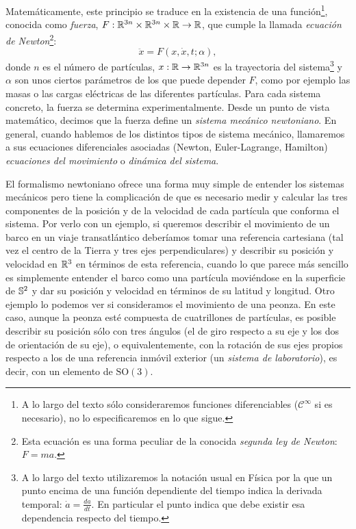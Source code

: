 Matemáticamente, este principio se traduce en la existencia de una función\footnote{A lo largo del texto sólo consideraremos funciones diferenciables ($\mathcal{C}^{\infty}$ si es necesario), no lo especificaremos en lo que sigue.}, conocida como \emph{fuerza}, $F: \mathbb{R}^{3n} \times \mathbb{R}^{3n} \times \mathbb{R} \rightarrow \mathbb{R}$, que cumple la llamada \emph{ecuación de Newton}\footnote{Esta ecuación es una forma peculiar de la conocida \emph{segunda ley de Newton}: $F=ma$.}:
\begin{equation*}
  \ddot{x} = F(x,\dot{x},t;\alpha),
\end{equation*}
donde $n$ es el número de partículas, $x:\mathbb{R} \rightarrow \mathbb{R}^{3n}$ es la trayectoria del sistema\footnote{A lo largo del texto utilizaremos la notación usual en Física por la que un punto encima de una función dependiente del tiempo indica la derivada temporal: $\dot{a}=\frac{da}{dt}$. En particular el punto indica que debe existir esa dependencia respecto del tiempo.} y $\alpha$ son unos ciertos parámetros de los que puede depender $F$, como por ejemplo las masas o las cargas eléctricas de las diferentes partículas. Para cada sistema concreto, la fuerza se determina experimentalmente. Desde un punto de vista matemático, decimos que la fuerza define un \emph{sistema mecánico newtoniano}. En general, cuando hablemos de los distintos tipos de sistema mecánico, llamaremos a sus ecuaciones diferenciales asociadas (Newton, Euler-Lagrange, Hamilton) \emph{ecuaciones del movimiento} o \emph{dinámica del sistema}.

El formalismo newtoniano ofrece una forma muy simple de entender los sistemas mecánicos pero tiene la complicación de que es necesario medir y calcular las tres componentes de la posición y de la velocidad de cada partícula que conforma el sistema. Por verlo con un ejemplo, si queremos describir el movimiento de un barco en un viaje transatlántico deberíamos tomar una referencia cartesiana (tal vez el centro de la Tierra y tres ejes perpendiculares) y describir su posición y velocidad en $\mathbb{R}^3$ en términos de esta referencia, cuando lo que parece más sencillo es simplemente entender el barco como una partícula moviéndose en la superficie de $\mathbb{S}^2$ y dar su posición y velocidad en términos de su latitud y longitud.
Otro ejemplo lo podemos ver si consideramos el movimiento de una peonza. En este caso, aunque la peonza esté compuesta de cuatrillones de partículas, es posible describir su posición sólo con tres ángulos (el de giro respecto a su eje y los dos de orientación de su eje), o equivalentemente, con la rotación de sus ejes propios respecto a los de una referencia inmóvil exterior (un \emph{sistema de laboratorio}), es decir, con un elemento de $\mathrm{SO}(3)$. 

